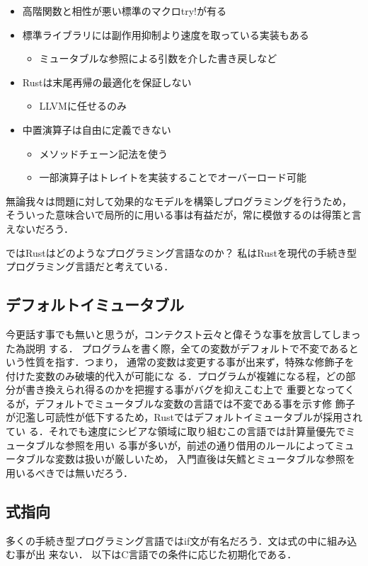 \begin{itemize}
\item 高階関数と相性が悪い標準のマクロtry!が有る
\item 標準ライブラリには副作用抑制より速度を取っている実装もある
  \begin{itemize}
  \item ミュータブルな参照による引数を介した書き戻しなど
  \end{itemize}
\item Rustは末尾再帰の最適化を保証しない
  \begin{itemize}
  \item LLVMに任せるのみ
  \end{itemize}
\item 中置演算子は自由に定義できない
  \begin{itemize}
  \item メソッドチェーン記法を使う
  \item 一部演算子はトレイトを実装することでオーバーロード可能
  \end{itemize}
\end{itemize}

無論我々は問題に対して効果的なモデルを構築しプログラミングを行うため，
そういった意味合いで局所的に用いる事は有益だが，常に模倣するのは得策と言えないだろう．

ではRustはどのようなプログラミング言語なのか？
私はRustを現代の手続き型プログラミング言語だと考えている．

\subsection{デフォルトイミュータブル}
今更話す事でも無いと思うが，コンテクスト云々と偉そうな事を放言してしまった為説明
する．
プログラムを書く際，全ての変数がデフォルトで不変であるという性質を指す．つまり，
通常の変数は変更する事が出来ず，特殊な修飾子を付けた変数のみ破壊的代入が可能にな
る．プログラムが複雑になる程，どの部分が書き換えられ得るのかを把握する事がバグを抑えこむ上で
重要となってくるが，デフォルトでミュータブルな変数の言語では不変である事を示す修
飾子が氾濫し可読性が低下するため，Rustではデフォルトイミュータブルが採用されてい
る．それでも速度にシビアな領域に取り組むこの言語では計算量優先でミュータブルな参照を用い
る事が多いが，前述の通り借用のルールによってミュータブルな変数は扱いが厳しいため，
入門直後は矢鱈とミュータブルな参照を用いるべきでは無いだろう．

\subsection{式指向}
多くの手続き型プログラミング言語ではif文が有名だろう．文は式の中に組み込む事が出
来ない．
以下はC言語での条件に応じた初期化である．

